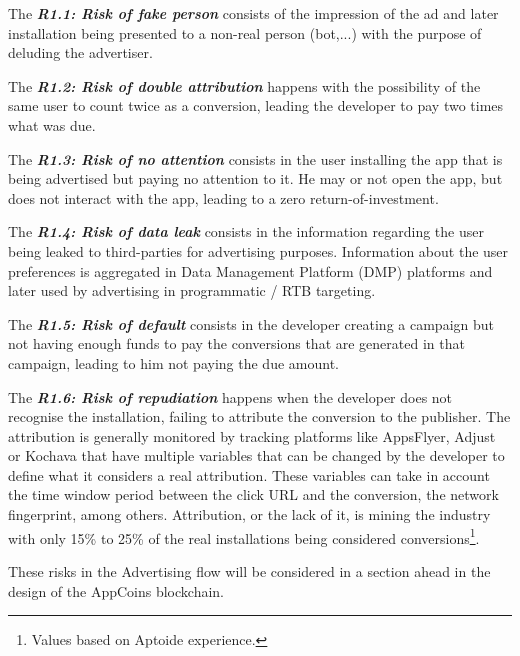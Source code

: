 \begin{tcolorbox}[enhanced jigsaw,sharp corners, drop fuzzy shadow=ShadowColor]

The {\bf\em R1.1: Risk of fake person} consists of the impression of the ad and later installation being presented to a non-real person (bot,...) with the purpose of deluding the advertiser. 


The {\bf\em R1.2: Risk of double attribution} happens with the possibility of the same user to count twice as a conversion, leading the developer to pay two times what was due.


The {\bf\em R1.3: Risk of no attention} consists in the user installing the app that is being advertised but paying no attention to it. He may or not open the app, but does not interact with the app, leading to a zero return-of-investment.


The {\bf\em R1.4: Risk of data leak} consists in the information regarding the user being leaked to third-parties for advertising purposes. Information about the user preferences is aggregated in Data Management Platform (DMP) platforms and later used by advertising in programmatic / RTB targeting. 

The {\bf\em R1.5: Risk of default} consists in the developer creating a campaign but not having enough funds to pay the conversions that are generated in that campaign, leading to him not paying the due amount.


The {\bf\em R1.6: Risk of repudiation} happens when the developer does not recognise the installation, failing to attribute the conversion to the publisher. The attribution is generally monitored by tracking platforms like AppsFlyer, Adjust or Kochava that have multiple variables that can be changed by the developer to define what it considers a real attribution. These variables can take in account the time window period between the click URL and the conversion, the network fingerprint, among others. Attribution, or the lack of it, is mining the industry with only 15\% to 25\% of the real installations being considered conversions\footnote{Values based on Aptoide experience.}.


\end{tcolorbox}

These risks in the Advertising flow will be considered in a section ahead in the design of the AppCoins blockchain.


